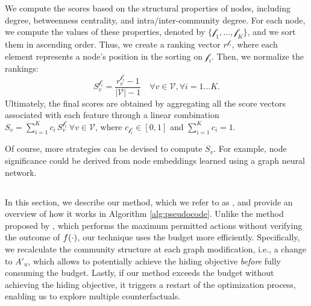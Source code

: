 We compute the scores based on the structural properties of nodes, including degree, betweenness centrality, and intra/inter-community degree.
For each node, we compute the values of these properties, denoted by $\{\mathcal{f_1},\dots,\mathcal{f}_K\}$, and we sort them in ascending order. Thus, we create a ranking vector $r^{\mathcal{f}_i}$, where each element represents a node's position in the sorting on $\mathcal{f}_i$. Then, we normalize the rankings:
\begin{equation}
    S_v^{\mathcal{f}_i} = \dfrac{r_v^{\mathcal{f}_i} - 1}{|\mathcal{V}| - 1} \quad \forall v \in \mathcal{V}, \forall i=1\dots K.
\end{equation}
Ultimately, the final scores are obtained by aggregating all the score vectors associated with each feature through a linear combination $S_v = \sum_{i=1}^K  c_i \, S_v^{\mathcal{f}_i} \ \forall v \in \mathcal{V}$, where $c_{\mathcal{f}_i} \in [0,1]$ and $\sum_{i=1}^K c_i = 1$.

Of course, more strategies can be devised to compute $S_v$. For example, node significance could be derived from node embeddings learned using a graph neural network.



\subsection{\method{}}
\label{subsec:alg}
In this section, we describe our method, which we refer to as \method{}, and provide an overview of how it works in Algorithm \ref{alg:pseudocode}. 
Unlike the method proposed by  \citet{bernini2024kdd}, which performs the maximum permitted actions without verifying the outcome of $f(\cdot)$, our technique uses the budget more efficiently.
Specifically, we recalculate the community structure at each graph modification, i.e., a change to $A'_u$, which allows to potentially achieve the hiding objective \textit{before} fully consuming the budget.
Lastly, if our method exceeds the budget without achieving the hiding objective, it triggers a restart of the optimization process, enabling us to explore multiple counterfactuals. 


